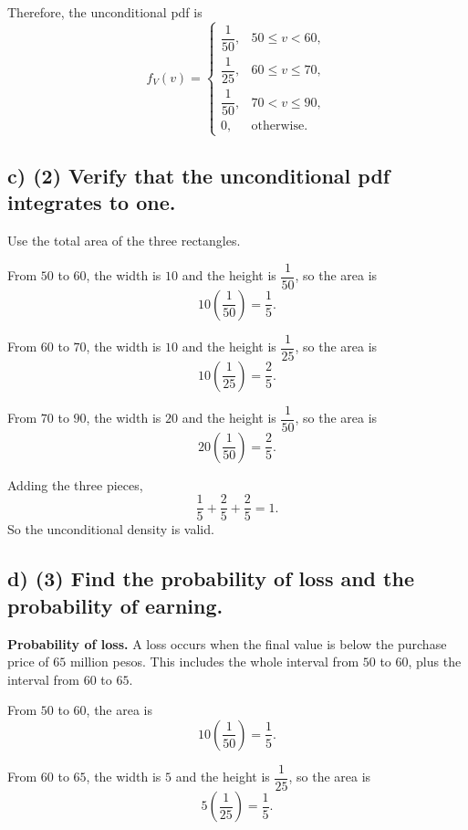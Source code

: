 Therefore, the unconditional pdf is
\[
f_V(v)=
\begin{cases}
	\dfrac{1}{50}, & 50\le v<60,\\[6pt]
	\dfrac{1}{25}, & 60\le v\le 70,\\[6pt]
	\dfrac{1}{50}, & 70<v\le 90,\\[6pt]
	0, & \text{otherwise.}
\end{cases}
\]


\subsection*{c) \textbf{(2)} Verify that the unconditional pdf integrates to one.}
\label{subsec:two-scenario-inventory-investment-c2-c}
Use the total area of the three rectangles.

From $50$ to $60$, the width is $10$ and the height is $\dfrac{1}{50}$, so the area is
\[
10\left(\frac{1}{50}\right)=\frac{1}{5}.
\]

From $60$ to $70$, the width is $10$ and the height is $\dfrac{1}{25}$, so the area is
\[
10\left(\frac{1}{25}\right)=\frac{2}{5}.
\]

From $70$ to $90$, the width is $20$ and the height is $\dfrac{1}{50}$, so the area is
\[
20\left(\frac{1}{50}\right)=\frac{2}{5}.
\]

Adding the three pieces,
\[
\frac{1}{5}+\frac{2}{5}+\frac{2}{5}=1.
\]
So the unconditional density is valid.


\subsection*{d) \textbf{(3)} Find the probability of loss and the probability of earning.}
\label{subsec:two-scenario-inventory-investment-c2-d}
\textbf{Probability of loss.} A loss occurs when the final value is below the purchase price of $65$ million pesos. This includes the whole interval from $50$ to $60$, plus the interval from $60$ to $65$.

From $50$ to $60$, the area is
\[
10\left(\frac{1}{50}\right)=\frac{1}{5}.
\]

From $60$ to $65$, the width is $5$ and the height is $\dfrac{1}{25}$, so the area is
\[
5\left(\frac{1}{25}\right)=\frac{1}{5}.
\]

